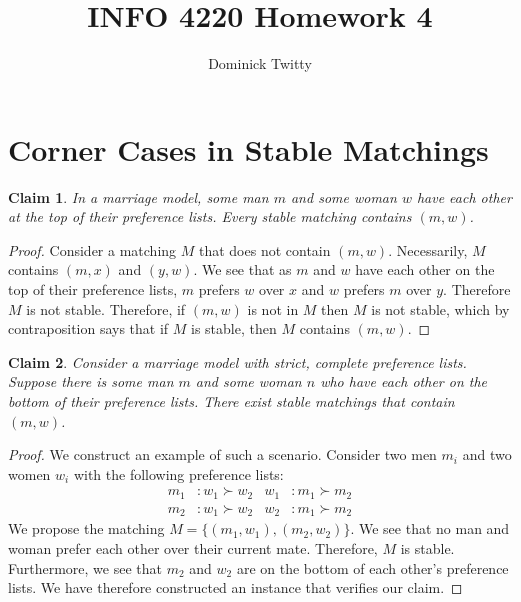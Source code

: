 \documentclass[12pt]{article}
\newtheorem*{claim}{Claim}
\begin{document}
\title{INFO 4220 Homework 4}
\author{Dominick Twitty}
\date{}
\maketitle
\section{Corner Cases in Stable Matchings}
\begin{claim}
In a marriage model, some man $m$ and some woman $w$ have each other at the top of their preference lists. Every stable matching contains $(m, w)$.
\end{claim}
\begin{proof}
Consider a matching $M$ that does not contain $(m, w)$. Necessarily, $M$ contains $(m, x)$ and $(y, w)$. We see that as $m$ and $w$ have each other on the top of their preference lists, $m$ prefers $w$ over $x$ and $w$ prefers $m$ over $y$. Therefore $M$ is not stable. Therefore, if $(m, w)$ is not in $M$ then $M$ is not stable, which by contraposition says that if $M$ is stable, then $M$ contains $(m, w)$.
\end{proof}

\begin{claim}
Consider a marriage model with strict, complete preference lists. Suppose there is some man $m$ and some woman $n$ who have each other on the bottom of their preference lists. There exist stable matchings that contain $(m, w)$.
\end{claim}
\begin{proof}
We construct an example of such a scenario. Consider two men $m_i$ and two women $w_i$ with the following preference lists:
\begin{align*}
m_1 &: w_1 \succ w_2 & w_1 &: m_1 \succ m_2\\
m_2 &: w_1 \succ w_2 & w_2 &: m_1 \succ m_2
\end{align*}
We propose the matching $M = \{(m_1, w_1), (m_2, w_2)\}$. We see that no man and woman prefer each other over their current mate. Therefore, $M$ is stable. Furthermore, we see that $m_2$ and $w_2$ are on the bottom of each other's preference lists. We have therefore constructed an instance that verifies our claim.
\end{proof}
\end{document}
